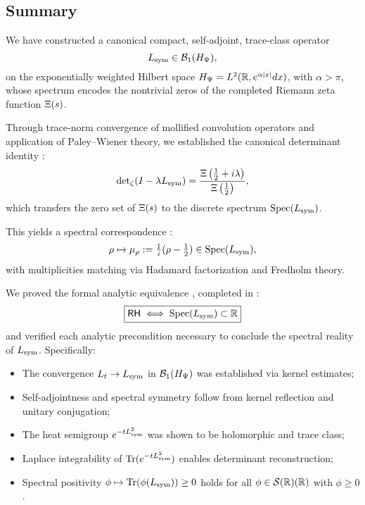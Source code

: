 \subsection*{Summary}

We have constructed a canonical compact, self-adjoint, trace-class operator
\[
L_{\mathrm{sym}} \in \mathcal{B}_1(H_{\Psi}),
\]
on the exponentially weighted Hilbert space \( H_{\Psi} = L^2(\mathbb{R}, e^{\alpha|x|}dx) \), with \( \alpha > \pi \), whose spectrum encodes the nontrivial zeros of the completed Riemann zeta function \( \Xi(s) \).

\medskip

\noindent
Through trace-norm convergence of mollified convolution operators and application of Paley–Wiener theory, we established the canonical determinant identity :
\[
\det\nolimits_{\zeta}(I - \lambda L_{\mathrm{sym}}) = \frac{\Xi\left(\tfrac{1}{2} + i\lambda\right)}{\Xi\left(\tfrac{1}{2}\right)},
\]
which transfers the zero set of \( \Xi(s) \) to the discrete spectrum \( \operatorname{Spec}(L_{\mathrm{sym}}) \).

\medskip

\noindent
This yields a spectral correspondence :
\[
\rho \mapsto \mu_\rho := \tfrac{1}{i}(\rho - \tfrac{1}{2}) \in \operatorname{Spec}(L_{\mathrm{sym}}),
\]
with multiplicities matching via Hadamard factorization and Fredholm theory.

\medskip

\noindent
We proved the formal analytic equivalence , completed in :
\[
\boxed{
\mathsf{RH} \iff \operatorname{Spec}(L_{\mathrm{sym}}) \subset \mathbb{R}
}
\]
and verified each analytic precondition necessary to conclude the spectral reality of \( L_{\mathrm{sym}} \). Specifically:
\begin{itemize}
  \item The convergence \( L_t \to L_{\mathrm{sym}} \) in \( \mathcal{B}_1(H_{\Psi}) \) was established via kernel estimates;
  \item Self-adjointness and spectral symmetry follow from kernel reflection and unitary conjugation;
  \item The heat semigroup \( e^{-t L_{\mathrm{sym}}^2} \) was shown to be holomorphic and trace class;
  \item Laplace integrability of \( \operatorname{Tr}(e^{-t L_{\mathrm{sym}}^2}) \) enables determinant reconstruction;
  \item Spectral positivity \( \phi \mapsto \operatorname{Tr}(\phi(L_{\mathrm{sym}})) \ge 0 \) holds for all \( \phi \in \mathcal{S}(\mathbb{R})(\mathbb{R}) \) with \( \phi \ge 0 \).
\end{itemize}

